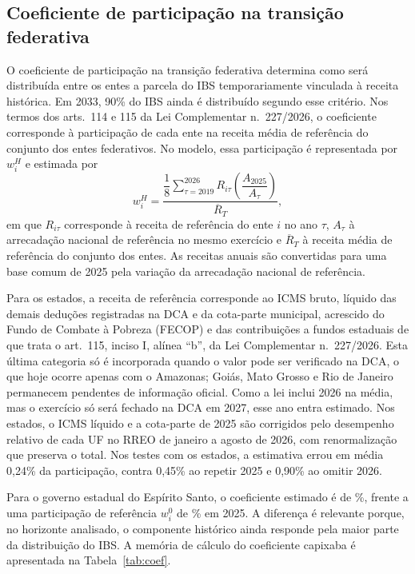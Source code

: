 \documentclass[12pt,a4paper]{article}
\newcommand{\nn}{n.\textordmasculine}
\begin{document}
\subsection{Coeficiente de participação na transição federativa}

O coeficiente de participação na transição federativa determina como será distribuída entre os entes a parcela do IBS temporariamente vinculada à receita histórica. Em 2033, 90\% do IBS ainda é distribuído segundo esse critério. Nos termos dos arts.~114 e 115 da Lei Complementar \nn~227/2026, o coeficiente corresponde à participação de cada ente na receita média de referência do conjunto dos entes federativos. No modelo, essa participação é representada por $w^{H}_{i}$ e estimada por
\begin{equation}\label{eq:wh}
  w^{H}_{i}=\frac{\dfrac{1}{8}\displaystyle\sum_{\tau=2019}^{2026}R_{i\tau}\left(\dfrac{A_{2025}}{A_{\tau}}\right)}{\overline{R}_{T}},
\end{equation}
em que $R_{i\tau}$ corresponde à receita de referência do ente $i$ no ano $\tau$, $A_{\tau}$ à arrecadação nacional de referência no mesmo exercício e $\overline{R}_{T}$ à receita média de referência do conjunto dos entes. As receitas anuais são convertidas para uma base comum de 2025 pela variação da arrecadação nacional de referência.

Para os estados, a receita de referência corresponde ao ICMS bruto, líquido das demais deduções registradas na DCA e da cota-parte municipal, acrescido do Fundo de Combate à Pobreza (FECOP) e das contribuições a fundos estaduais de que trata o art.~115, inciso I, alínea ``b'', da Lei Complementar \nn~227/2026. Esta última categoria só é incorporada quando o valor pode ser verificado na DCA, o que hoje ocorre apenas com o Amazonas; Goiás, Mato Grosso e Rio de Janeiro permanecem pendentes de informação oficial. Como a lei inclui 2026 na média, mas o exercício só será fechado na DCA em 2027, esse ano entra estimado. Nos estados, o ICMS líquido e a cota-parte de 2025 são corrigidos pelo desempenho relativo de cada UF no RREO de janeiro a agosto de 2026, com renormalização que preserva o total. Nos testes com os estados, a estimativa errou em média 0,24\% da participação, contra 0,45\% ao repetir 2025 e 0,90\% ao omitir 2026.

Para o governo estadual do Espírito Santo, o coeficiente estimado é de \NumCoefCq\%, frente a uma participação de referência $w^{0}_{i}$ de \NumCoefNq\% em 2025. A diferença é relevante porque, no horizonte analisado, o componente histórico ainda responde pela maior parte da distribuição do IBS. A memória de cálculo do coeficiente capixaba é apresentada na Tabela~\ref{tab:coef}.
\end{document}
